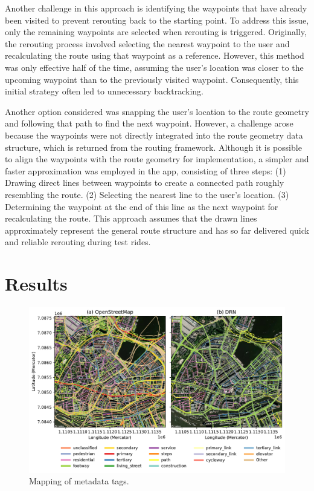 Another challenge in this approach is identifying the waypoints that have already been visited to prevent rerouting back to the starting point. To address this issue, only the remaining waypoints are selected when rerouting is triggered. Originally, the rerouting process involved selecting the nearest waypoint to the user and recalculating the route using that waypoint as a reference. However, this method was only effective half of the time, assuming the user's location was closer to the upcoming waypoint than to the previously visited waypoint. Consequently, this initial strategy often led to unnecessary backtracking.

Another option considered was snapping the user's location to the route geometry and following that path to find the next waypoint. However, a challenge arose because the waypoints were not directly integrated into the route geometry data structure, which is returned from the routing framework. Although it is possible to align the waypoints with the route geometry for implementation, a simpler and faster approximation was employed in the app, consisting of three steps: (1) Drawing direct lines between waypoints to create a connected path roughly resembling the route. (2) Selecting the nearest line to the user's location. (3) Determining the waypoint at the end of this line as the next waypoint for recalculating the route. This approach assumes that the drawn lines approximately represent the general route structure and has so far delivered quick and reliable rerouting during test rides.

\begin{Summary}

\end{Summary}

\section{Results}

\begin{figure}[htbp]
\centering
\includegraphics[width=\linewidth]{images/routing-drn-osm-map.pdf}
\caption{Mapping of metadata tags.}
\label{fig:}
\end{figure}

